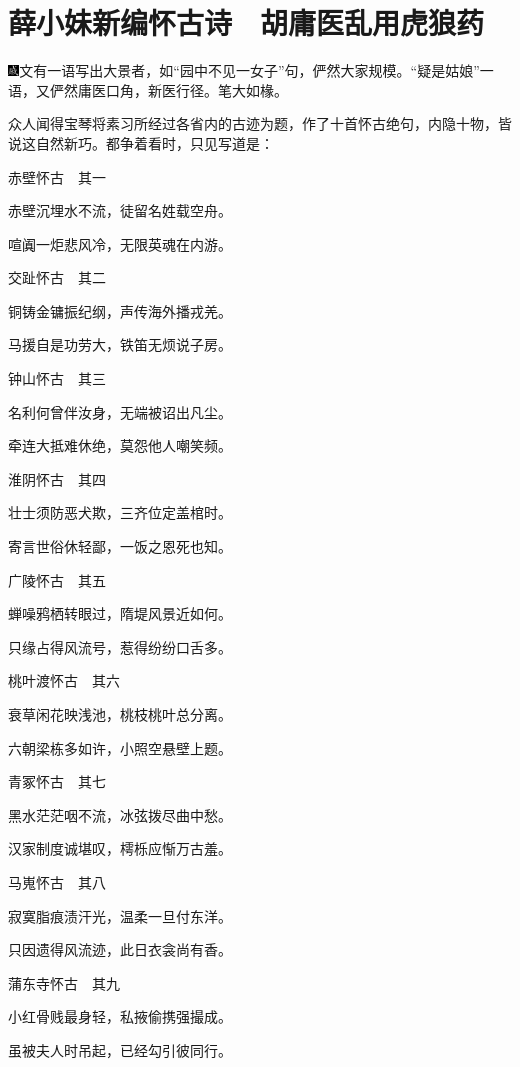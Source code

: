 

\chapter{薛小妹新编怀古诗　胡庸医乱用虎狼药}

{\includegraphics[width=3mm]{../Images/00005}文有一语写出大景者，如``园中不见一女子''句，俨然大家规模。``疑是姑娘''一语，又俨然庸医口角，新医行径。笔大如椽。}

众人闻得宝琴将素习所经过各省内的古迹为题，作了十首怀古绝句，内隐十物，皆说这自然新巧。都争着看时，只见写道是：

赤壁怀古　其一

赤壁沉埋水不流，徒留名姓载空舟。

喧阗一炬悲风冷，无限英魂在内游。

交趾怀古　其二

铜铸金镛振纪纲，声传海外播戎羌。

马援自是功劳大，铁笛无烦说子房。

钟山怀古　其三

名利何曾伴汝身，无端被诏出凡尘。

牵连大抵难休绝，莫怨他人嘲笑频。

淮阴怀古　其四

壮士须防恶犬欺，三齐位定盖棺时。

寄言世俗休轻鄙，一饭之恩死也知。

广陵怀古　其五

蝉噪鸦栖转眼过，隋堤风景近如何。

只缘占得风流号，惹得纷纷口舌多。

桃叶渡怀古　其六

衰草闲花映浅池，桃枝桃叶总分离。

六朝梁栋多如许，小照空悬壁上题。

青冢怀古　其七

黑水茫茫咽不流，冰弦拨尽曲中愁。

汉家制度诚堪叹，樗栎应惭万古羞。

马嵬怀古　其八

寂寞脂痕渍汗光，温柔一旦付东洋。

只因遗得风流迹，此日衣衾尚有香。

蒲东寺怀古　其九

小红骨贱最身轻，私掖偷携强撮成。

虽被夫人时吊起，已经勾引彼同行。

